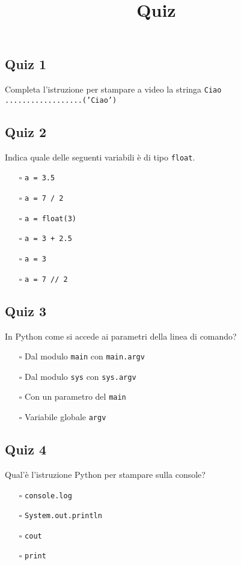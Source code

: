 \documentclass{article}
\title{Quiz}
\begin{document}
\pagestyle{fancy}
\fancyhf{}


\subsection*{Quiz 1}
Completa l'istruzione per stampare a video la stringa \texttt{Ciao}\\
\verb|..................|\texttt{('Ciao')}\subsection*{Quiz 2}
Indica quale delle seguenti variabili è di tipo \texttt{float}.
\begin{itemize}
  \item[$\square$] \texttt{a = 3.5}
  \item[$\square$] \texttt{a = 7 / 2}
  \item[$\square$] \texttt{a = float(3)}
  \item[$\square$] \texttt{a = 3 + 2.5}
  \item[$\square$] \texttt{a = 3}
  \item[$\square$] \texttt{a = 7 // 2}
\end{itemize}
\subsection*{Quiz 3}
In Python come si accede ai parametri della linea di comando?
\begin{itemize}
  \item[$\square$] Dal modulo \texttt{main} con \texttt{main.argv}
  \item[$\square$] Dal modulo \texttt{sys} con \texttt{sys.argv}
  \item[$\square$] Con un parametro del \texttt{main}
  \item[$\square$] Variabile globale \texttt{argv}
\end{itemize}
\subsection*{Quiz 4}
Qual'è l'istruzione Python per stampare sulla console?
\begin{itemize}
  \item[$\square$] \texttt{console.log}
  \item[$\square$] \texttt{System.out.println}
  \item[$\square$] \texttt{cout}
  \item[$\square$] \texttt{print}
\end{itemize}
\end{document}
